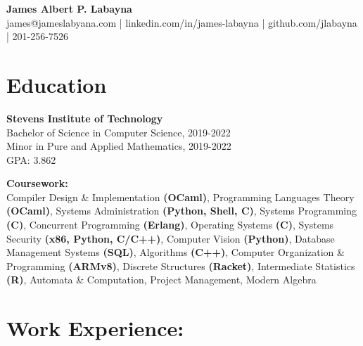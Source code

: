 \documentclass[10pt,letterpaper]{article}
\begin{document}
  \begin{center}
    \textbf{James Albert P. Labayna} \\
    \small james@jameslabyana.com | linkedin.com/in/james-labayna | github.com/jlabayna | 201-256-7526
  \end{center}
  
  \iffalse
  \begin{minipage}[t]{2in}
    \textbf{Present Address:} \\
    205 Hudson St, Apt. 602 \\
    Hoboken, NJ 07030 \\
    201.256.7526
  \end{minipage}
  \hfill
  \begin{minipage}[t]{2.4in}
    \textbf{Permanent Address:} \\
    294 S. Washington Ave., Apt. 87 \\
    Bergenfield, NJ 07030
  \end{minipage}
  \fi
  
  \section{Education}
    \textbf{Stevens Institute of Technology} \\
    Bachelor of Science in Computer Science, 2019-2022 \\
    Minor in Pure and Applied Mathematics, 2019-2022 \\
    GPA: 3.862
    
    \noindent\textbf{Coursework:}\\
    Compiler Design \& Implementation \textbf{(OCaml)},
    Programming Languages Theory \textbf{(OCaml)},
    Systems Administration \textbf{(Python, Shell, C)},
    Systems Programming \textbf{(C)},
    Concurrent Programming \textbf{(Erlang)},
    Operating Systems \textbf{(C)},
    Systems Security \textbf{(x86, Python, C/C++)},
    Computer Vision \textbf{(Python)},
    Database Management Systems \textbf{(SQL)},
    Algorithms \textbf{(C++)},
    Computer Organization \& Programming \textbf{(ARMv8)},
    Discrete Structures \textbf{(Racket)},
    Intermediate Statistics \textbf{(R)},
    Automata \& Computation,
    Project Management,
    Modern Algebra
   
  \section{Work Experience:}
	
\end{document}
